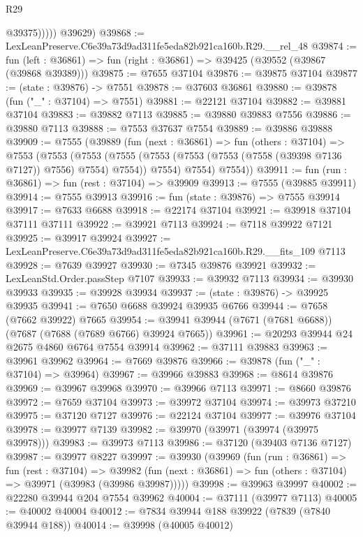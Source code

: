 \begin{lexlean}{R29}
\begin{coremodule}
                @39375)))))
      @39629)
@39868 := LexLeanPreserve.C6e39a73d9ad311fe5eda82b921ca160b.R29.__rel_48
@39874 := fun (left : @36861) => fun (right : @36861) => @39425 (@39552 (@39867 (@39868 @39389)))
@39875 := @7655 @37104
@39876 := @39875 @37104
@39877 := (state : @39876) -> @7551
@39878 := @37603 @36861
@39880 := @39878 (fun ("_" : @37104) => @7551)
@39881 := @22121 @37104
@39882 := @39881 @37104
@39883 := @39882 @7113
@39885 := @39880 @39883 @7556
@39886 := @39880 @7113
@39888 := @7553 @37637 @7554
@39889 := @39886 @39888
@39909 := @7555
    (@39889
      (fun (next : @36861) =>
      fun (others : @37104) =>
      @7553
        (@7553
          (@7553
            (@7555 (@7553 (@7553 (@7553 (@7558 (@39398 @7136 @7127)) @7556) @7554) @7554))
            @7554)
          @7554)
        @7554))
@39911 := fun (run : @36861) => fun (rest : @37104) => @39909
@39913 := @7555 (@39885 @39911)
@39914 := @7555 @39913
@39916 := fun (state : @39876) => @7555 @39914
@39917 := @7633 @6688
@39918 := @22174 @37104
@39921 := @39918 @37104 @37111 @37111
@39922 := @39921 @7113
@39924 := @7118 @39922 @7121
@39925 := @39917 @39924
@39927 := LexLeanPreserve.C6e39a73d9ad311fe5eda82b921ca160b.R29.__fits_109 @7113
@39928 := @7639 @39927
@39930 := @7345 @39876 @39921
@39932 := LexLeanStd.Order.passStep @7107
@39933 := @39932 @7113
@39934 := @39930 @39933
@39935 := @39928 @39934
@39937 := (state : @39876) -> @39925 @39935
@39941 := @7650 @6688 @39924 @39935 @6766
@39944 := @7658 (@7662 @39922) @7665
@39954 := @39941 @39944 (@7671 (@7681 @6688)) (@7687 (@7688 (@7689 @6766) @39924 @7665))
@39961 := @20293 @39944 @24 @2675 @4860 @6764 @7554 @39914
@39962 := @37111 @39883
@39963 := @39961 @39962
@39964 := @7669 @39876
@39966 := @39878 (fun ("_" : @37104) => @39964)
@39967 := @39966 @39883
@39968 := @8614 @39876
@39969 := @39967 @39968
@39970 := @39966 @7113
@39971 := @8660 @39876
@39972 := @7659 @37104
@39973 := @39972 @37104
@39974 := @39973 @37210
@39975 := @37120 @7127
@39976 := @22124 @37104
@39977 := @39976 @37104
@39978 := @39977 @7139
@39982 := @39970 (@39971 (@39974 (@39975 @39978)))
@39983 := @39973 @7113
@39986 := @37120 (@39403 @7136 @7127)
@39987 := @39977 @8227
@39997 := @39930
    (@39969
      (fun (run : @36861) =>
      fun (rest : @37104) =>
      @39982 (fun (next : @36861) => fun (others : @37104) => @39971 (@39983 (@39986 @39987)))))
@39998 := @39963 @39997
@40002 := @22280 @39944 @204 @7554 @39962
@40004 := @37111 (@39977 @7113)
@40005 := @40002 @40004
@40012 := @7834 @39944 @188 @39922 (@7839 (@7840 @39944 @188))
@40014 := @39998 (@40005 @40012)

\end{coremodule}
\end{lexlean}
